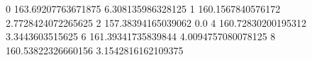 0 163.69207763671875 6.308135986328125
1 160.1567840576172 2.7728424072265625
2 157.38394165039062 0.0
4 160.72830200195312 3.3443603515625
6 161.39341735839844 4.0094757080078125
8 160.53822326660156 3.1542816162109375
